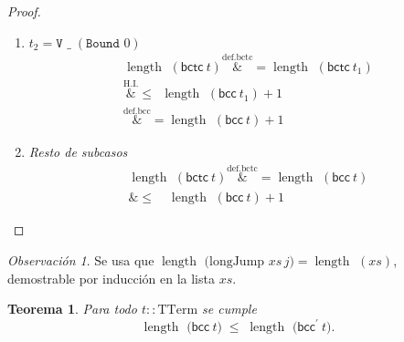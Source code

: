 \documentclass[12pt]{article}
\newcommand{\length}{\operatorname{length\  }}
\newcommand{\bcc}[1]{\mathsf{bcc}\ #1}
\newcommand{\bctc}[1]{\mathsf{bctc}\ #1}
\newtheorem{theorem}{Teorema}
\theoremstyle{remark}
\newtheorem*{remark}{Observación}
\newcommand{\bccp}[1]{\mathsf{bcc}^{\prime}\ #1}
\newcommand{\overeqa}[1]{\overset{\mathrm{#1}}&{=}}
\newcommand{\overlea}[1]{\overset{\mathrm{#1}}&{\le}}
\begin{document}
\begin{proof}
\begin{enumerate}[label=\textbf{(\alph*)},wide,topsep=4pt]
\begin{enumerate}[label=\textbf{(\roman*)}, leftmargin=6em]
  \item $t_2=\texttt{V }\_\;(\texttt{Bound }0)$
  \begin{align*}
        \length(\bctc{t}) \overeqa{def.bctc} \length(\bctc{t_1}) \\ 
        \overlea{H.I.} \ \  \length(\bcc{t_1})+1 \\
        \overeqa{def.bcc} \length(\bcc{t})+1
  \end{align*}


  \item \emph{Resto de subcasos}  
        \begin{align*}
            \length(\bctc{t}) \overeqa{def.bctc} \length(\bcc{t}) \\
            \overlea{} \quad \length(\bcc{t}) + 1
        \end{align*}
\end{enumerate}
\end{enumerate}

\end{proof}

\begin{remark}
Se usa que  
$\length\bigl(\text{longJump }xs\,j\bigr)=\length(xs)$,  
demostrable por inducción en la lista $xs$.
\end{remark}

\begin{theorem}
Para todo $t :: \mathrm{TTerm}$ se cumple
\[
  \length\!\bigl(\bcc{t}\bigr)\;\le\;
  \length\!\bigl(\bccp{t}\bigr).
\]
\end{theorem}
\end{document}
